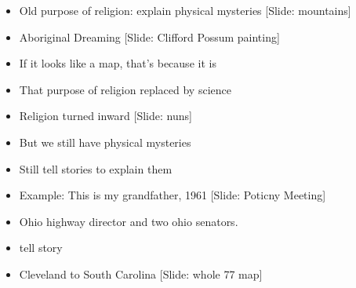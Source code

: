 \documentclass[12pt]{article}
\begin{document}
{\Huge

\begin{itemize}

\item Old purpose of religion:  explain physical mysteries [Slide:  mountains]



\item Aboriginal Dreaming [Slide:  Clifford Possum painting]

\item If it looks like a map, that's because it is

\item That purpose of religion replaced by science

\item Religion turned inward [Slide:  nuns]

\item But we still have physical mysteries

\item Still tell stories to explain them





\item Example:  This is my grandfather, 1961 [Slide: Poticny Meeting]

\item Ohio highway director and two ohio senators.

\item tell story 

\item Cleveland to South Carolina [Slide:  whole 77 map]


\end{itemize}}
\end{document}
